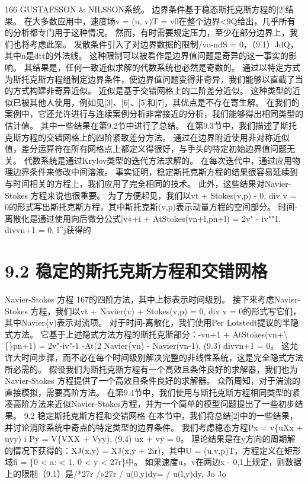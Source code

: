 \documentclass[UTF8,11pt,a4paper,openany,fontset=fandol]{ctexbook}
\begin{document}
166 GUSTAFSSON \& NILSSON系统。 边界条件基于稳态斯托克斯方程的[2]结果。 在大多数应用中，速度场v = (u, v)T = v0在整个边界<9Q给出，几乎所有的分析都专门用于这种情况。 然而，有时需要规定压力，至少在部分边界上，我们也将考虑此案。 发散条件引入了对边界数据的限制/vo-ndS = 0，（9.1）JdQ，其中n是dtt的外法线。 这种限制可以被看作是边界值问题是奇异的这一事实的影响。 其结果是，任何一致近似求解的代数系统也必然是奇数的。 通过以特定方式为斯托克斯方程组制定边界条件，使边界值问题变得非奇异，我们能够以直截了当的方式构建非奇异近似。 近似是基于交错网格上的二阶差分近似。 这种类型的近似已被其他人使用，例如见[3]、[6]、[5]和[7]，其优点是不存在寄生解。 在我们的案例中，它还允许进行与连续案例分析非常接近的分析，我们能够得出相同类型的估计值。 其中一些结果在第9.2节中进行了总结。 在第9.3节中，我们描述了斯托克斯方程的交错网格上的四阶紧致差分方法。 通过在边界附近使用非对称近似值，差分运算符在所有网格点上都定义得很好，与手头的特定初始边界值问题无关。 代数系统是通过Krylov类型的迭代方法求解的。 在每次迭代中，通过应用物理边界条件来修改中间溶液。 事实证明，稳定斯托克斯方程的结果很容易延续到与时间相关的方程上，我们应用了完全相同的技术。 此外，这些结果对Navier-Stokes 方程来说也很重要。 为了方便起见，我们以vt + Stokes(v,p) - 0, div v = 0的形式写出斯托克斯方程，其中斯托克斯(v,p)表示动量方程的空间部分。 时间-离散化是通过使用向后微分公式|v«+i + AtStokes(vn+l,pn+l) = 2v" - iv""1, divvn+1 = 0, l\textasciicircum{}j获得的

\section{9.2 稳定的斯托克斯方程和交错网格}
Navier-Stokes 方程 167的四阶方法，其中上标表示时间级别。 接下来考虑Navier-Stokes 方程，我们以vt + Navier(v) + Stokes(v,p) = 0, div v = 0的形式写它们，其中Navier\{v)表示对流项。 对于时间-离散化，我们使用Per Lotstedt提议的半隐式方法。 它基于上述隐式方法方程的斯托克斯部分：-vn+1 + AtStokes(vn+\textbackslash\{\}pn+1) = 2v"-iv"-1 -At(2 Navier\{vn) - Navier(vn-1), (9.3) divvn+1 = 0。 这允许大时间步骤，而不必在每个时间级别解决完整的非线性系统，这是完全隐式方法所必需的。 假设我们为斯托克斯方程有一个高效且条件良好的求解器，我们也为Navier-Stokes 方程提供了一个高效且条件良好的求解器。 众所周知，对于湍流的直接模拟，需要高阶方法。 在第9.4节中，我们使用与斯托克斯方程相同类型的紧凑高阶方法来近似Navier-Stokes方程，并为一个简单的模型问题提出了一些初步结果。 9.2 稳定斯托克斯方程和交错网格 在本节中，我们将总结[2]中的一些结果，并讨论消除系统中奇点的特定类型的边界条件。 我们考虑稳态方程Px = v\{uXx + uyy) i Py = V\{VXX + Vyy), (9.4) ux + vy = 0。 理论结果是在y方向的周期解的情况下获得的：XJ(x,y) = XJ(x,y + 2ir)，其中U = (u,v,p)T，方程定义在矩形域fi = \{0 < a: < 1, 0 < y < 27r\}中。 如果速度u，v在两边x - 0,1上规定，则数据上的限制（9.1）是/*27r /»27r / u(0,y)dy= / u(l,y)dy, Jo Jo
\end{document}
